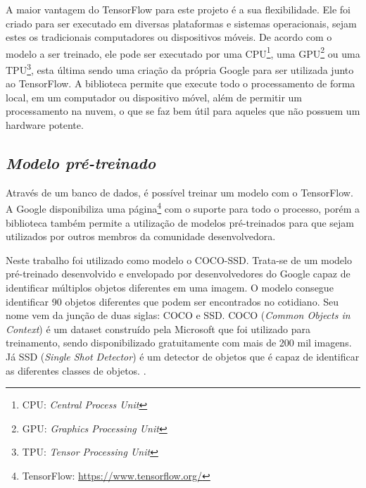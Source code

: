 A maior vantagem do TensorFlow para este projeto é a sua flexibilidade. Ele foi criado para ser executado em diversas plataformas e sistemas operacionais, sejam estes os tradicionais computadores ou dispositivos móveis. De acordo com o modelo a ser treinado, ele pode ser executado por uma CPU\footnote{CPU: \textit{Central Process Unit}}, uma GPU\footnote{GPU: \textit{Graphics Processing Unit}} ou uma TPU\footnote{TPU: \textit{Tensor Processing Unit}}, esta última sendo uma criação da própria Google para ser utilizada junto ao TensorFlow. A biblioteca permite que execute todo o processamento de forma local, em um computador ou dispositivo móvel, além de permitir um processamento na nuvem, o que se faz bem útil para aqueles que não possuem um hardware potente.


\subsection{\textit{Modelo pré-treinado}}\label{sec:Cap3_D_Modelo}

Através de um banco de dados, é possível treinar um modelo com o TensorFlow. A Google disponibiliza uma página\footnote{TensorFlow: \url{https://www.tensorflow.org/}} com o suporte para todo o processo, porém a biblioteca também permite a utilização de modelos pré-treinados para que sejam utilizados por outros membros da comunidade desenvolvedora.

Neste trabalho foi utilizado como modelo o COCO-SSD. Trata-se de um modelo pré-treinado desenvolvido e envelopado por desenvolvedores do Google capaz de identificar múltiplos objetos diferentes em uma imagem. O modelo consegue identificar 90 objetos diferentes \cite{noauthor_pre-trained_2021} que podem ser encontrados no cotidiano. Seu nome vem da junção de duas siglas: COCO e SSD. COCO (\textit{Common Objects in Context}) é um dataset construído pela Microsoft que foi utilizado para treinamento, sendo disponibilizado gratuitamente com mais de 200 mil imagens. Já SSD (\textit{Single Shot Detector}) é um detector de objetos que é capaz de identificar as diferentes classes de objetos. \cite{forson_understanding_2019}.


